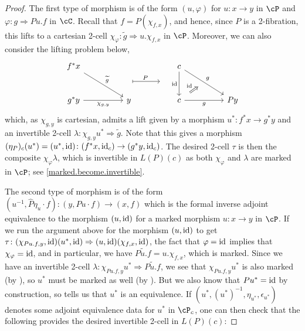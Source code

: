 \documentclass[11pt, dvipsnames]{amsart}
\begin{document}
\begin{proof}
The first type of morphism is of the form $(u,\varphi)$ for $u\colon x\to y$ in $\cP$ and $\varphi\colon g\Rightarrow Pu.f$ in $\cC$. Recall that $f=P(\chi_{f,x})$, and hence, since $P$ is a 2-fibration, this lifts to a cartesian 2-cell $\chi_{\varphi}\colon \widetilde{g}\Rightarrow u.\chi_{f,x}$ in $\cP$. Moreover, we can also consider the lifting problem below,
\[\begin{tikzcd}[row sep = small]
				f^*x &&&& c \\
				&& {} && {} \\
				g^*y && y && c && Py
				\arrow["\widetilde{g}", from=1-1, to=3-3]
				\arrow["\id"', from=1-5, to=3-5]
				\arrow[""{name=0, anchor=center, inner sep=0}, "g", from=1-5, to=3-7]
				\arrow["P"{pos=0.3}, shorten >=19pt, maps to, from=2-3, to=2-5]
				\arrow["\chi_{g,y}"', from=3-1, to=3-3]
				\arrow["g"', from=3-5, to=3-7]
				\arrow["\id", shorten <=8pt, shorten >=8pt, Rightarrow, from=3-5, to=0]
			\end{tikzcd}\]
which, as $\chi_{g,y}$ is cartesian, admits a lift given by a morphism $u^*\colon f^*x\to g^* y$ and an invertible 2-cell $\lambda\colon \chi_{g,y}u^*\Rightarrow \widetilde{g}$. Note that this gives a morphism $(\eta_P)_c(u^*)=(u^*,\mathrm{id})\colon (f^*x,\mathrm{id}_c)\to (g^*y,\mathrm{id}_c)$. The desired 2-cell $\tau$ is then the composite $\chi_{\varphi}\lambda$, which is invertible in $L(P)(c)$ as both $\chi_{\varphi}$ and $\lambda$ are marked in $\cP$; see \cref{marked.become.invertible}. 

The second type of morphism is of the form $(u^{-1},\widehat{P}\eta_u\cdot f)\colon (y,Pu\cdot f)\to (x,f)$ which is the formal inverse adjoint equivalence to the morphism $(u,\mathrm{id})$ for a marked morphism $u\colon x\to y$ in $\cP$. If we run the argument above for the morphism $(u,\mathrm{id})$ to get $\tau\colon (\chi_{Pu.f,y},\mathrm{id})(u^*,\mathrm{id})\Rightarrow (u,\mathrm{id})(\chi_{f,x},\mathrm{id})$, the fact that $\varphi=\mathrm{id}$ implies that $\chi_\varphi=\mathrm{id}$, and in particular, we have $\widetilde{Pu.f}=u.\chi_{f,x}$, which is marked. Since we have an invertible 2-cell $\lambda\colon \chi_{Pu.f,y}u^*\Rightarrow \widetilde{Pu.f}$, we see that $\chi_{Pu.f,y}u^*$ is also marked (by ), so $u^*$ must be marked as well (by ). But we also know that $Pu^*=\mathrm{id}$ by construction, so  tells us that $u^*$ is an equivalence. If $(u^*, (u^*)^{-1},\eta_{u^*},\epsilon_{u^*})$ denotes some adjoint equivalence data for $u^*$ in $\cP_c$, one can then check that the following provides the desired invertible 2-cell in $L(P)(c)$:


\end{proof}
\end{document}
